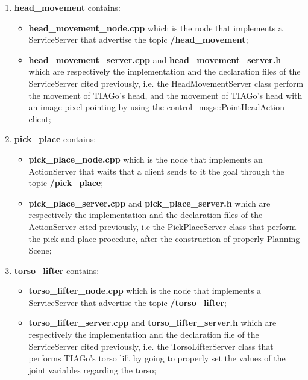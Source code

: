 \begin{enumerate}
    \item \textbf{head\_movement} contains:
    \begin{itemize}
        \item \textbf{head\_movement\_node.cpp} which is the node that implements a ServiceServer that advertise the topic \textbf{/head\_movement};
        \item \textbf{head\_movement\_server.cpp} and \textbf{head\_movement\_server.h} which are respectively the implementation and the declaration files of the ServiceServer cited previously, i.e. the HeadMovementServer class perform the movement of TIAGo's head, and the movement of TIAGo's head with an image pixel pointing by using the control\_msgs::PointHeadAction client;         
    \end{itemize}
    \item \textbf{pick\_place} contains:
    \begin{itemize}
        \item \textbf{pick\_place\_node.cpp} which is the node that implements an ActionServer that waits that a client sends to it the goal through the topic \textbf{/pick\_place};
        \item \textbf{pick\_place\_server.cpp} and \textbf{pick\_place\_server.h} which are respectively the implementation and the declaration files of the ActionServer cited previously, i.e the PickPlaceServer class that perform the pick and place procedure, after the construction of properly Planning Scene;       
    \end{itemize}
    \item \textbf{torso\_lifter} contains:
    \begin{itemize}
        \item \textbf{torso\_lifter\_node.cpp} which is the node that implements a ServiceServer that advertise the topic \textbf{/torso\_lifter};
        \item \textbf{torso\_lifter\_server.cpp} and \textbf{torso\_lifter\_server.h} which are respectively the implementation and the declaration file of the ServiceServer cited previously, i.e. the TorsoLifterServer class that performs TIAGo's torso lift by going to properly set the values of the joint variables regarding the torso;        
    \end{itemize}
\end{enumerate}
